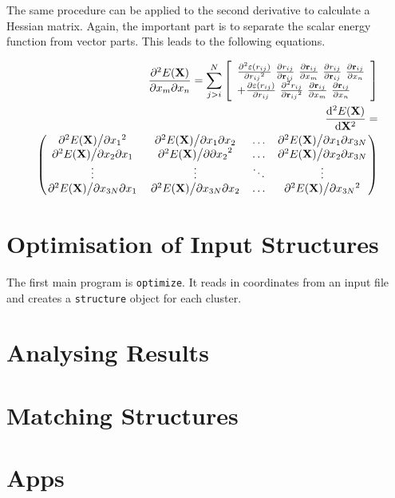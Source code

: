 The same procedure can be applied to the second derivative to calculate a
Hessian matrix. Again, the important part is to separate the scalar energy
function from vector parts. This leads to the following equations.

\begin{align}
    \pdv{E(\mathbf{X})}{x_m}{x_n}=\sum_{j>i}^N\left[  
    \begin{array}{ll}
    \pdv[2]{\varepsilon(r_{ij})}{{r_{ij}}}\  
    \pdv{r_{ij}}{\mathbf{r}_{ij}}\ 
    \pdv{\mathbf{r}_{ij}}{x_m}\ 
    \pdv{r_{ij}}{\mathbf{r}_{ij}}\ 
    \pdv{\mathbf{r}_{ij}}{x_n} \\ 
    +
    \pdv{\varepsilon(r_{ij})}{r_{ij}}\
        \pdv[2]{r_{ij}}{{\mathbf{r}_{ij}}}\ 
    \pdv{\mathbf{r}_{ij}}{x_m}\ 
    \pdv{\mathbf{r}_{ij}}{x_n} 
    \end{array}
    \right]\\
    \begin{aligned}
    \dv[2]{E(\mathbf{X})}{\mathbf{X}}=\\
    \begin{pmatrix}
        \pdv*[2]{E(\mathbf{X})}{{x_1}} & \pdv*{E(\mathbf{X})}{x_1}{x_2} & \ldots & \pdv*{E(\mathbf{X})}{x_1}{x_{3N}}\\
        \pdv*{E(\mathbf{X})}{x_2}{x_1} & \pdv*[2]{E(\mathbf{X})}{{\partial x_2}} & \ldots & \pdv*{E(\mathbf{X})}{x_2}{x_{3N}}\\
        \vdots & \vdots & \ddots & \vdots\\
        \pdv*{E(\mathbf{X})}{x_{3N}}{x_1} & \pdv*{E(\mathbf{X})}{x_{3N}}{x_2} & \ldots & \pdv*[2]{E(\mathbf{X})}{{x_{3N}}}
    \end{pmatrix}
    \end{aligned}
\end{align}

\section{Optimisation of Input Structures}
\label{sec:optimisationofinputstructures}

The first main program is \verb|optimize|. It reads in coordinates from an
input file and creates a \verb|structure| object for each cluster.  

\section{Analysing Results}
\label{sec:analysingresults}

\section{Matching Structures}
\label{sec:matchingstructures}

\section{Apps}
\label{sec:apps}
